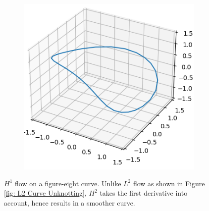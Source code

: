 \documentclass[../dissertation.tex]{subfiles}
\begin{document}
\begin{figure}[tbp]
\begin{subfigure}[b]{0.32\textwidth}
    \end{subfigure}
    \begin{subfigure}[b]{0.32\textwidth}
        \centering
        \includegraphics[width=\textwidth]{sections/unknottingCurveImgs/figure8-H1-2}
    \end{subfigure}

    \caption{$H^1$ flow on a figure-eight curve. Unlike $L^2$ flow as shown in Figure \ref{fig: L2 Curve Unknotting}, $H^2$ takes the first derivative into account, hence results in a smoother curve.}
    \label{fig: H1 Curve Unknotting}
\end{figure}
\end{document}
